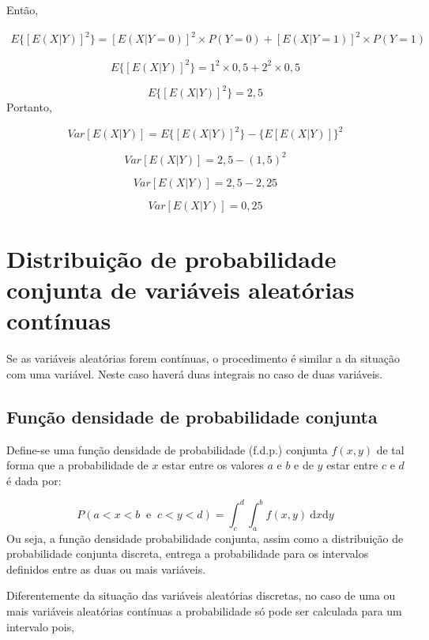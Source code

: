 \documentclass[
]{book}
\begin{document}
Então,

\begin{multline}
  E\{[E(X|Y)]^2\} = [E(X|Y=0)]^2\times P(Y=0) + [E(X|Y=1)]^2\times P(Y=1) 
\end{multline}

\[
  E\{[E(X|Y)]^2\} = 1^2\times 0,5 + 2^2\times 0,5 
\]

\[
  E\{[E(X|Y)]^2\} = 2,5 
\]
Portanto,

\[
  Var[E(X|Y)] = E\{[E(X|Y)]^2\} - \{E[E(X|Y)]\}^2 
\]

\[
  Var[E(X|Y)] = 2,5 - (1,5)^2 
\]

\[
  Var[E(X|Y)] = 2,5 - 2,25 
\]

\[
  Var[E(X|Y)] = 0,25
\]

\hypertarget{distribuiuxe7uxe3o-de-probabilidade-conjunta-de-variuxe1veis-aleatuxf3rias-contuxednuas}{%
\section{Distribuição de probabilidade conjunta de variáveis aleatórias contínuas}\label{distribuiuxe7uxe3o-de-probabilidade-conjunta-de-variuxe1veis-aleatuxf3rias-contuxednuas}}

Se as variáveis aleatórias forem contínuas, o procedimento é similar a da situação com uma variável. Neste caso haverá duas integrais no caso de duas variáveis.

\hypertarget{funuxe7uxe3o-densidade-de-probabilidade-conjunta}{%
\subsection{Função densidade de probabilidade conjunta}\label{funuxe7uxe3o-densidade-de-probabilidade-conjunta}}

Define-se uma função densidade de probabilidade (f.d.p.) conjunta \(f(x,y)\) de tal forma que a probabilidade de \(x\) estar entre os valores \(a\) e \(b\) e de \(y\) estar entre \(c\) e \(d\) é dada por:

\[
  P(a < x < b ~\text{ e }~ c < y < d) = \int_{c}^{d}\int_{a}^{b}f(x,y)~\text{d}x \text{d}y
  \label{eq:FdpConjunta}
\]
Ou seja, a função densidade probabilidade conjunta, assim como a distribuição de probabilidade conjunta discreta, entrega a probabilidade para os intervalos definidos entre as duas ou mais variáveis.

Diferentemente da situação das variáveis aleatórias discretas, no caso de uma ou mais variáveis aleatórias contínuas a probabilidade só pode ser calculada para um intervalo pois,
\end{document}
